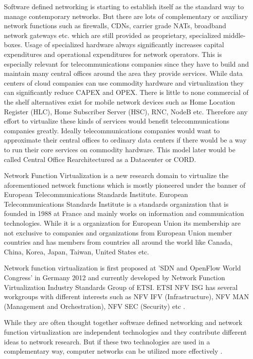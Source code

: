 \documentclass[12pt,oneandhalf,chaparabic,ceng,ms,eng,oneside,pntc]{gsufbe}
\begin{document}
Software defined networking is starting to establish itself as the standard way to manage contemporary
networks.  But there are lots of complementary or auxiliary network functions such as firewalls, CDNs,
carrier grade NATs, broadband network gateways etc.  which are still provided as proprietary,
specialized middle-boxes.  Usage of specialized hardware always significantly increases capital
expenditures and operational expenditures for network operators.  This is especially relevant for
telecommunications companies since they have to build and maintain many central offices around
the area they provide services.  While data centers of cloud companies can use commodity hardware and
virtualization they can significantly reduce CAPEX and OPEX.  There is little to none commercial of the
shelf alternatives exist for mobile network devices such as Home Location Register (HLC), Home
Subscriber Server (HSC), RNC, NodeB etc.  \cite{khalid_standardized_2016} Therefore any effort to 
virtualize these kinds of services
would benefit telecommunications companies greatly.  Ideally telecommunications
companies would want to
approximate their central offices to ordinary data centers if there would be a way to run their core
services on commodity hardware.  This model later would be called Central Office Rearchitectured as a
Datacenter or CORD.

Network Function Virtualization is a new research domain to virtualize the aforementioned network
functions which is mostly pioneered under the banner of European Telecommunications Standards
Institute.  European Telecommunications Standards Institute \cite{etsi} is a standards organization
that is
founded in 1988 at France and mainly works on information and communication technologies.  While it is a
organization for European Union its membership are not exclusive to companies and organizations from
European Union member countries and has members from countries all around the world like Canada, China,
Korea, Japan, Taiwan, United States etc.

Network function virtualization is first proposed at 'SDN and OpenFlow World Congress' in
Germany 2012 and currently developed by Network Function Virtualization Industry Standards Group of
ETSI.  ETSI NFV ISG has several workgroups with different interests such as NFV IFV (Infrastructure),
NFV MAN (Management and Orchestration), NFV SEC (Security) etc \cite{ntt_nfv}.

While they are often thought together software defined networking and network function virtualization
are independent technologies and they contribute different ideas to network research.  But if these two
technologies are used in a complementary way, computer networks can be utilized more effectively
\cite{gray_network_2016}.
\end{document}
